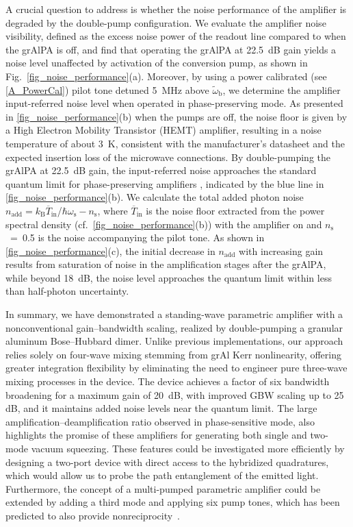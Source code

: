 \documentclass[%
reprint,
floatfix,
superscriptaddress,
amsmath,amssymb,
aps,
pra,
]{revtex4-2}
\begin{document}
A crucial question to address is whether the noise performance of the amplifier is degraded by the double-pump configuration. 
We evaluate the amplifier noise visibility, defined as the excess noise power of the readout line compared to when the grAlPA is off, and find that operating the grAlPA at 22.5~dB gain yields a noise level unaffected by activation of the conversion pump, as shown in Fig.~\ref{fig_noise_performance}(a).
Moreover, by using a power calibrated (see \cref{A_PowerCal}) pilot tone detuned 5~MHz above $\tilde{\omega}\mathrm{_b}$, we determine the amplifier input-referred noise level when operated in phase-preserving mode. As presented in \cref{fig_noise_performance}(b) when the pumps are off, the noise floor is given by a High Electron Mobility Transistor (HEMT) amplifier, resulting in a noise temperature of about 3~K, consistent with the manufacturer's datasheet \cite{HEMT_LNF} and the expected insertion loss of the microwave connections. By double-pumping the grAlPA at 22.5~dB gain, the input-referred noise approaches the standard quantum limit for phase-preserving amplifiers \cite{Caves1982Oct}, indicated by the blue line in \cref{fig_noise_performance}(b). We calculate the total added photon noise $n\mathrm{_{add}}=k\mathrm{_B}\overline{T}\mathrm{_{in}}$/$\hbar\omega\mathrm{_s}-n\mathrm{_{s}}$, where $\overline{T}\mathrm{_{in}}$ is the noise floor extracted from the power spectral density (cf.~\cref{fig_noise_performance}(b)) with the amplifier on and $n\mathrm{_{s}}$~=~0.5 is the noise accompanying the pilot tone. 
As shown in \cref{fig_noise_performance}(c), the initial decrease in $n\mathrm{_{add}}$ with increasing gain results from saturation of noise in the amplification stages after the grAlPA, while beyond 18~dB, the noise level approaches the quantum limit within less than half-photon uncertainty.

In summary, we have demonstrated a standing-wave parametric amplifier with a nonconventional gain–bandwidth scaling, realized by double-pumping a granular aluminum Bose–Hubbard dimer. 
Unlike previous implementations, our approach relies solely on four-wave mixing stemming from grAl Kerr nonlinearity, offering greater integration flexibility by eliminating the need to engineer pure three-wave mixing processes in the device.
The device achieves a factor of six bandwidth broadening for a maximum gain of 20~dB, with improved GBW scaling up to 25 dB, and it maintains added noise levels near the quantum limit. The large amplification–deamplification ratio observed in phase-sensitive mode, also highlights the promise of these amplifiers for generating both single and two-mode vacuum squeezing. These features could be investigated more efficiently by designing a two-port device with direct access to the hybridized quadratures, which would allow us to probe the path entanglement of the emitted light. Furthermore, the concept of a multi-pumped parametric amplifier could be extended by adding a third mode and applying six pump tones, which has been predicted to also provide nonreciprocity~\cite{Metelmann2015Jun,Metelmann2022Bog}.
\end{document}
